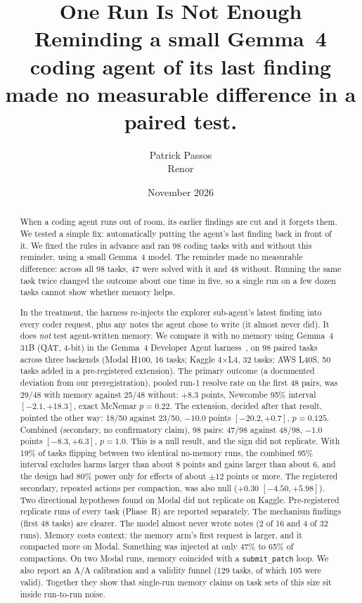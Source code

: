 \documentclass[11pt]{article}
\title{One Run Is Not Enough\\[0.35em]
{\large Reminding a small Gemma~4 coding agent of its last finding made no measurable difference in a paired test.}}
\author{Patrick Passos\\Renor}
\date{November 2026}
\newcommand{\code}[1]{\texttt{#1}}
\begin{document}
\maketitle

\begin{abstract}
When a coding agent runs out of room, its earlier findings are cut and it forgets them. We tested a simple fix: automatically putting the agent's last finding back in front of it. We fixed the rules in advance and ran 98 coding tasks with and without this reminder, using a small Gemma~4 model. The reminder made no measurable difference: across all 98 tasks, 47 were solved with it and 48 without. Running the same task twice changed the outcome about one time in five, so a single run on a few dozen tasks cannot show whether memory helps.

In the treatment, the harness re-injects the explorer sub-agent's latest finding into every coder request, plus any notes the agent chose to write (it
almost never did). It does \emph{not} test agent-written memory.
We compare it with no memory using Gemma~4 31B (QAT,
4-bit) in the Gemma~4 Developer Agent harness~\citep{kaggle2026gemma4agent}, on 98 paired tasks
across three backends (Modal H100, 16 tasks; Kaggle 4$\times$L4, 32 tasks; AWS L40S, 50 tasks added in
a pre-registered extension). The primary outcome (a documented deviation from our preregistration), pooled run-1 resolve rate on the
first 48 pairs, was 29/48 with memory against 25/48 without: $+8.3$ points, Newcombe 95\% interval
$[-2.1, +18.3]$, exact McNemar $p=0.22$. The extension, decided after that result, pointed the other
way: 18/50 against 23/50, $-10.0$ points $[-20.2, +0.7]$, $p=0.125$. Combined (secondary, no
confirmatory claim), 98 pairs: 47/98 against 48/98, $-1.0$ points $[-8.3, +6.3]$, $p=1.0$. This is a
null result, and the sign did not replicate. With 19\% of tasks flipping between two identical
no-memory runs, the combined 95\% interval excludes harms larger than about 8 points and gains larger than about 6, and the design had 80\% power only for effects of about $\pm12$ points or more. The registered secondary, repeated actions
per compaction, was also null ($+0.30$ $[-4.50, +5.98]$). Two directional hypotheses found on Modal
did not replicate on Kaggle. Pre-registered replicate runs of every task (Phase~R) are reported separately. The mechanism findings (first 48 tasks) are clearer. The model almost never wrote notes
(2 of 16 and 4 of 32 runs). Memory costs context: the memory arm's first request is larger, and it
compacted more on Modal. Something was injected at only 47\% to 65\% of compactions. On two Modal
runs, memory coincided with a \code{submit\_patch} loop. We also report an A/A calibration and a
validity funnel (129 tasks, of which 105 were valid). Together they show that single-run memory
claims on task sets of this size sit inside run-to-run noise.
\end{abstract}
\end{document}
